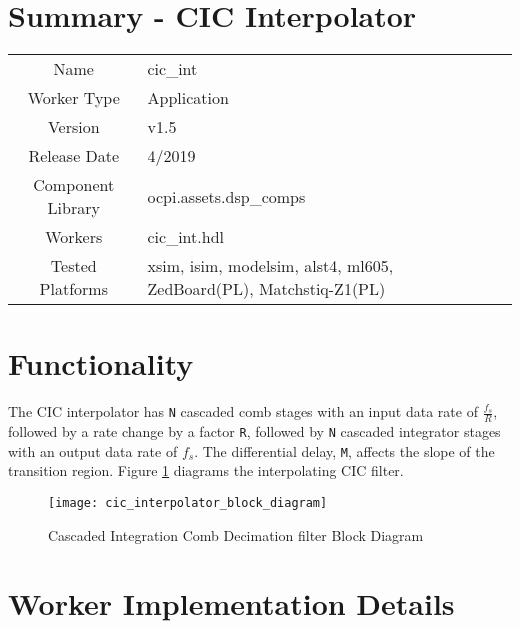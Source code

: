 \documentclass{article}
\author{} %
\date{Version \docVersion} %
\title{\docTitle}
\def\docVersion{1.5}
\def\comp{cic\_int}
\def\Comp{CIC Interpolator}
\def\importpath{../../cic_dec.test/doc/}
\begin{document}
\section*{Summary - \Comp}
\begin{tabular}{|c|M{13.5cm}|}
	\hline
	                  &                                                    \\
	\hline
	Name              & \comp                                              \\
	\hline
	Worker Type       & Application                                        \\
	\hline
	Version           & v\docVersion \\
	\hline
	Release Date      & 4/2019 \\
	\hline
	Component Library & ocpi.assets.dsp\_comps                              \\
	\hline
	Workers           & \comp.hdl                                          \\
	\hline
	Tested Platforms  & xsim, isim, modelsim, alst4, ml605, ZedBoard(PL), Matchstiq-Z1(PL) \\
	\hline
\end{tabular}

\section*{Functionality}
\begin{flushleft}
	The CIC interpolator has \verb+N+ cascaded comb stages with an input data rate of $\frac{f_{s}}{R}$, followed by a rate change by a factor \verb+R+, followed by \verb+N+ cascaded integrator stages with an output data rate of $f_{s}$. The differential delay, \verb+M+, affects the slope of the transition region. Figure \ref{fig:cic} diagrams the interpolating CIC filter.

	\begin{figure}[ht]
		\centering
		\texttt{[image: cic\_interpolator\_block\_diagram]}
		\caption{Cascaded Integration Comb Decimation filter Block Diagram}
		\label{fig:cic}
	\end{figure}
\end{flushleft}

\section*{Worker Implementation Details}


\end{document}
